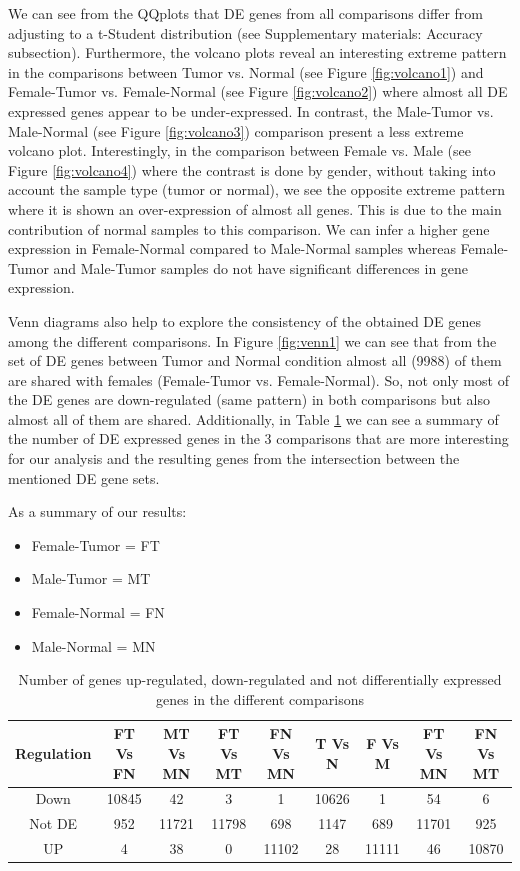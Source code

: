 \documentclass[9pt,twocolumn,twoside]{gsajnl}
\begin{document}
We can see from the QQplots that DE genes from all comparisons differ from adjusting to a t-Student distribution (see Supplementary materials: Accuracy subsection). Furthermore, the volcano plots reveal an interesting extreme pattern in the comparisons between Tumor vs. Normal (see Figure \ref{fig:volcano1}) and Female-Tumor vs. Female-Normal (see Figure \ref{fig:volcano2}) where almost all DE expressed genes appear to be under-expressed. In contrast, the Male-Tumor vs. Male-Normal (see Figure \ref{fig:volcano3}) comparison present a less extreme volcano plot. Interestingly, in the comparison between Female vs. Male (see Figure \ref{fig:volcano4}) where the contrast is done by gender, without taking into account the sample type (tumor or normal), we see the opposite extreme pattern where it is shown an over-expression of almost all genes. This is due to the main contribution of normal samples to this comparison. We can infer a higher gene expression in Female-Normal compared to Male-Normal samples whereas Female-Tumor and Male-Tumor samples do not have significant differences in gene expression. 

Venn diagrams also help to explore the consistency of the obtained DE genes among the different comparisons. In Figure \ref{fig:venn1} we can see that from the set of DE genes between Tumor and Normal condition almost all (9988) of them are shared with females (Female-Tumor vs. Female-Normal). So, not only most of the DE genes are down-regulated (same pattern) in both comparisons but also almost all of them are shared. Additionally, in Table \ref{tab:1} we can see a summary of the number of DE expressed genes in the 3 comparisons that are more interesting for our analysis and the resulting genes from the intersection between the mentioned DE gene sets.


As a summary of our results:
\begin{itemize}
\item Female-Tumor = FT
\item Male-Tumor = MT
\item Female-Normal = FN
\item Male-Normal = MN
\end{itemize}

\bigskip

\begin{table}[t]
  \centering
  \begin{tabular}{c|cccccccc}
     Regulation & FT Vs FN & MT Vs MN & FT Vs MT & FN Vs MN & T Vs N & F Vs M & FT Vs MN & FN Vs MT \\ \hline
     Down & 10845 & 42 & 3 & 1 & 10626 & 1 & 54 & 6 \\ 
     Not DE & 952 & 11721 & 11798 & 698 & 1147 & 689 & 11701 & 925 \\
     UP & 4 & 38 & 0 & 11102 & 28 & 11111 & 46 & 10870
  \end{tabular}
  \caption{Number of genes up-regulated, down-regulated and not differentially expressed genes in the different comparisons}
  \label{tab:1}
\end{table}
\end{document}
